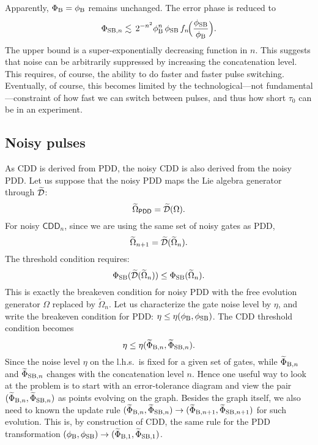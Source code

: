 \documentclass[pra,reprint,superscriptaddress]{revtex4-2}
\newcommand{\wt}[1]{\widetilde{#1}}
\newcommand{\CDDn}{\mathsf{CDD}_n}
\begin{document}
Apparently, $\Phi_{\mathrm{B}} = \phi_{\mathrm{B}}$ remains unchanged.
The error phase is reduced to
\begin{equation}
 \Phi_{\mathrm{SB},n} \lesssim \,
2^{-n^2} \phi_{\mathrm{B}}^{n}\,\phi_{\mathrm{SB}} \,f_n\!\Bigl(\frac{\phi_{\mathrm{SB}}}{\phi_{\mathrm{B}}}\Bigr).
\end{equation}
The upper bound is a super-exponentially decreasing function in $n$. This suggests that noise can be arbitrarily suppressed by increasing the concatenation level.  This requires, of course, the ability to do faster and faster pulse switching.
Eventually, of course, this becomes limited by the technological---not fundamental---constraint of how fast we can switch between pulses, and thus how short $\tau_0$ can be in an experiment.

\subsection{Noisy pulses}
As CDD is derived from PDD, the noisy CDD is also derived from the noisy PDD. 
Let us suppose that the noisy PDD maps the Lie algebra generator through $\wt\cD$:
\begin{equation}
 \wt\Omega_\mathsf{PDD} = \wt\cD(\Omega).
\end{equation}
For noisy $\CDDn$, since we are using the same set of noisy gates as PDD,
\begin{equation}
 \wt\Omega_{n+1}=\wt\cD (\wt\Omega_n).
\end{equation}
The threshold condition requires:
\begin{equation}
 \Phi_\rSB(\wt\cD (\wt\Omega_{n})) \le \Phi_\rSB(\wt\Omega_{n}).
\end{equation}
This is exactly the breakeven condition for noisy PDD with the free evolution generator $\Omega$ replaced by $\wt\Omega_n$.
Let us characterize the gate noise level by $\eta$,
and write the breakeven condition for PDD:
$ \eta \le \eta(\phi_{\mathrm{B}},\phi_{\mathrm{SB}})$.
The CDD threshold condition becomes 
\begin{equation}
 \eta \le \eta(\wt\Phi_{\rB,n},\wt\Phi_{\rSB,n}).
\end{equation}
Since the noise level $\eta$ on the l.h.s.\ is fixed for a given set of gates, while $\wt\Phi_{\rB,n}$ and  $\wt\Phi_{\rSB,n}$ changes with the concatenation level $n$. Hence one useful way to look at the problem is to start with an error-tolerance diagram and view the pair $(\wt\Phi_{\rB,n},\wt\Phi_{\rSB,n})$ as points evolving on the graph. Besides the graph itself, we also need to known the update rule
$(\wt\Phi_{\rB,n},\wt\Phi_{\rSB,n})\to(\wt\Phi_{\rB,n+1},\wt\Phi_{\rSB,n+1})$  for such evolution. This is, by construction of CDD, the same rule for the PDD transformation $(\phi_{\rB},\phi_{\rSB})\to(\wt\Phi_{\rB,1},\wt\Phi_{\rSB,1})$. 
\end{document}
